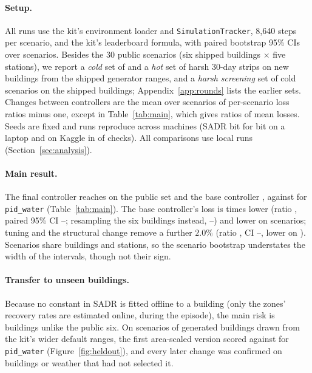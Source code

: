 \documentclass{article}
\begin{document}
\paragraph{Setup.} All runs use the kit's environment loader and \texttt{SimulationTracker}, 8,640 steps per scenario, and the kit's leaderboard formula, with paired bootstrap 95\% CIs over scenarios. Besides the 30 public scenarios (six shipped buildings $\times$ five stations), we report a \emph{cold} set of \RTenConfHarshCThreeN{} and a \emph{hot} set of \RTenConfHotHN{} harsh 30-day strips on \RTenNNewBuild{} new buildings from the shipped generator ranges, and a \emph{harsh screening} set of \RSixHarshSN{} cold scenarios on the shipped buildings; Appendix~\ref{app:rounds} lists the earlier sets. Changes between controllers are the mean over scenarios of per-scenario loss ratios minus one, except in Table~\ref{tab:main}, which gives ratios of mean losses. Seeds are fixed and runs reproduce across machines (SADR bit for bit on a laptop and on Kaggle in \RSixReproIdentical{} of \RSixReproN{} checks). All comparisons use local runs (Section~\ref{sec:analysis}).



\paragraph{Main result.} The final controller reaches \FinPub{} on the public set and the base controller \RTenConfPubCand, against \MetricPidWater{} for \texttt{pid\_water} (Table~\ref{tab:main}). The base controller's loss is \RElvPwTimes{} times lower (ratio \RElvPwRatio, paired 95\% CI \RElvPwRatioLo--\RElvPwRatioHi; resampling the six buildings instead, \RElvPwRatioCLo--\RElvPwRatioCHi) and lower on \RElvPwWins{} scenarios; tuning and the structural change remove a further \(2.0\%\) (ratio \FinPubRatio, CI \FinPubRatioLo--\FinPubRatioHi, lower on \FinPubWins). Scenarios share buildings and stations, so the scenario bootstrap understates the width of the intervals, though not their sign.

\paragraph{Transfer to unseen buildings.} Because no constant in SADR is fitted offline to a building (only the zones' recovery rates are estimated online, during the episode), the main risk is buildings unlike the public six. On \NHeldAll{} scenarios of \NHeldAllBuild{} generated buildings drawn from the kit's wider default ranges, the first area-scaled version scored \HeldAllMetricOurs{} against \HeldAllMetricPidWater{} for \texttt{pid\_water} (Figure~\ref{fig:heldout}), and every later change was confirmed on buildings or weather that had not selected it.
\end{document}
